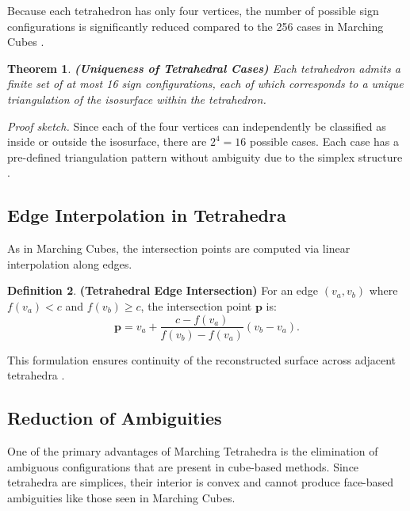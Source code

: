 \documentclass[12pt, a4paper, oneside]{book}
\theoremstyle{plain}
\newtheorem{theorem}{Theorem}[chapter]
\theoremstyle{definition}
\newtheorem{definition}[theorem]{Definition}
\theoremstyle{remark}
\theoremstyle{definition}
\begin{document}
Because each tetrahedron has only four vertices, the number of possible sign configurations is significantly reduced compared to the 256 cases in Marching Cubes \cite{shirley1990marching}.

\vspace{0.5em}

\begin{theorem}
    \textbf{(Uniqueness of Tetrahedral Cases)}
Each tetrahedron admits a finite set of at most 16 sign configurations, each of which corresponds to a unique triangulation of the isosurface within the tetrahedron.

\end{theorem}

\textit{Proof sketch.} Since each of the four vertices can independently be classified as inside or outside the isosurface, there are $2^4 = 16$ possible cases. Each case has a pre-defined triangulation pattern without ambiguity due to the simplex structure \cite{treece1999regularised}.

\vspace{0.5em}

\subsection{Edge Interpolation in Tetrahedra}

As in Marching Cubes, the intersection points are computed via linear interpolation along edges.

\begin{definition}
    \textbf{(Tetrahedral Edge Intersection)}
For an edge $(v_a, v_b)$ where $f(v_a) < c$ and $f(v_b) \geq c$, the intersection point $\mathbf{p}$ is:
\[
\mathbf{p} = v_a + \frac{c - f(v_a)}{f(v_b) - f(v_a)} (v_b - v_a).
\]
\end{definition}


This formulation ensures continuity of the reconstructed surface across adjacent tetrahedra \cite{bloomenthal1997introduction}.

\vspace{0.5em}

\subsection{Reduction of Ambiguities}

One of the primary advantages of Marching Tetrahedra is the elimination of ambiguous configurations that are present in cube-based methods. Since tetrahedra are simplices, their interior is convex and cannot produce face-based ambiguities like those seen in Marching Cubes.
\end{document}
